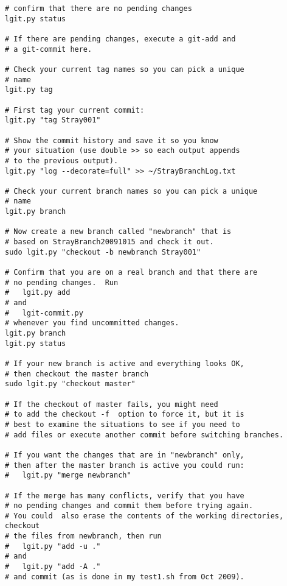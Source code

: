 \documentclass{ltxdoc}
\begin{document}
\begin{verbatim}
# confirm that there are no pending changes
lgit.py status

# If there are pending changes, execute a git-add and 
# a git-commit here.

# Check your current tag names so you can pick a unique 
# name
lgit.py tag

# First tag your current commit:
lgit.py "tag Stray001"

# Show the commit history and save it so you know 
# your situation (use double >> so each output appends
# to the previous output).
lgit.py "log --decorate=full" >> ~/StrayBranchLog.txt

# Check your current branch names so you can pick a unique 
# name
lgit.py branch

# Now create a new branch called "newbranch" that is
# based on StrayBranch20091015 and check it out.
sudo lgit.py "checkout -b newbranch Stray001"

# Confirm that you are on a real branch and that there are
# no pending changes.  Run 
#   lgit.py add 
# and 
#   lgit-commit.py
# whenever you find uncommitted changes.
lgit.py branch
lgit.py status

# If your new branch is active and everything looks OK,
# then checkout the master branch
sudo lgit.py "checkout master"

# If the checkout of master fails, you might need 
# to add the checkout -f  option to force it, but it is
# best to examine the situations to see if you need to 
# add files or execute another commit before switching branches.

# If you want the changes that are in "newbranch" only,
# then after the master branch is active you could run:
#   lgit.py "merge newbranch"

# If the merge has many conflicts, verify that you have
# no pending changes and commit them before trying again.
# You could  also erase the contents of the working directories, checkout 
# the files from newbranch, then run 
#   lgit.py "add -u ."
# and 
#   lgit.py "add -A ."
# and commit (as is done in my test1.sh from Oct 2009).
\end{verbatim}
\end{document}
